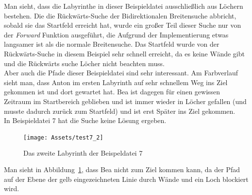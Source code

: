 \documentclass[a4paper,10pt,ngerman]{scrartcl}
\begin{document}
    Man sieht, dass die Labyrinthe in dieser Beispieldatei ausschließlich aus Löchern bestehen.
    Die die Rückwärts-Suche der Bidirektionalen Breitensuche abbricht, sobald sie das Startfeld erreicht hat, wurde ein großer Teil dieser Suche nur von der \textit{Forward} Funktion ausgeführt, die Aufgrund der Implementierung etwas langsamer ist als die normale Breitensuche.
    Das Startfeld wurde von der Rückwärts-Suche in diesem Beispiel sehr schnell erreicht, da es keine Wände gibt und die Rückwärts suche Löcher nicht beachten muss. \\
    Aber auch die Pfade dieser Beispieldatei sind sehr interessant.
    Am Farbverlauf sieht man, dass Anton im ersten Labyrinth auf sehr schnellem Weg ins Ziel gekommen ist und dort gewartet hat.
    Bea ist dagegen für einen gewissen Zeitraum im Startbereich geblieben und ist immer wieder in Löcher gefallen (und musste dadurch zurück zum Startfeld) und ist erst Später ins Ziel gekommen. \\
    In Beispieldatei 7 hat die Suche keine Lösung ergeben.
    \begin{figure}[H]
        \label{fig:7}
        \centering
        \texttt{[image: Assets/test7\_2]}

        \caption{Das zweite Labyrinth der Beispeldatei 7}
    \end{figure}
    Man sieht in Abbildung~\ref{fig:7}, dass Bea nicht zum Ziel kommen kann, da der Pfad auf der Ebene der gelb eingezeichneten Linie durch Wände und ein Loch blockiert wird.
\end{document}
